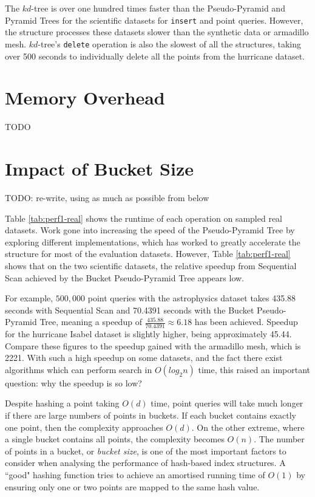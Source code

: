 The $kd$-tree is over one hundred times faster than the Pseudo-Pyramid and Pyramid Trees for the scientific datasets for \texttt{insert} and point queries. However, the structure processes these datasets slower than the synthetic data or armadillo mesh. $kd$-tree's \texttt{delete} operation is also the slowest of all the structures, taking over 500 seconds to individually delete all the points from the hurricane dataset.



\section{Memory Overhead}

TODO

\section{Impact of Bucket Size}

TODO: re-write, using as much as possible from below


Table \ref{tab:perf1-real} shows the runtime of each operation on sampled real datasets. Work gone into increasing the speed of the Pseudo-Pyramid Tree by exploring different implementations, which has worked to greatly accelerate the structure for most of the evaluation datasets. However, Table \ref{tab:perf1-real} shows that on the two scientific datasets, the relative speedup from Sequential Scan achieved by the Bucket Pseudo-Pyramid Tree appears low.

For example, $500,000$ point queries with the astrophysics dataset takes 435.88 seconds with Sequential Scan and 70.4391 seconds with the Bucket Pseudo-Pyramid Tree, meaning a speedup of $\frac{435.88}{70.4391} \approx 6.18$ has been achieved. Speedup for the hurricane Isabel dataset is slightly higher, being approximately 45.44. Compare these figures to the speedup gained with the armadillo mesh, which is 2221. With such a high speedup on some datasets, and the fact there exist algorithms which can perform search in $O(log_2 n)$ time, this raised an important question: why the speedup is so low?

Despite hashing a point taking $O(d)$ time, point queries will take much longer if there are large numbers of points in buckets. If each bucket contains exactly one point, then the complexity approaches $O(d)$. On the other extreme, where a single bucket contains all points, the complexity becomes $O(n)$. The number of points in a bucket, or \textit{bucket size}, is one of the most important factors to consider when analysing the performance of hash-based index structures. A ``good" hashing function tries to achieve an amortised running time of $O(1)$ by ensuring only one or two points are mapped to the same hash value.

